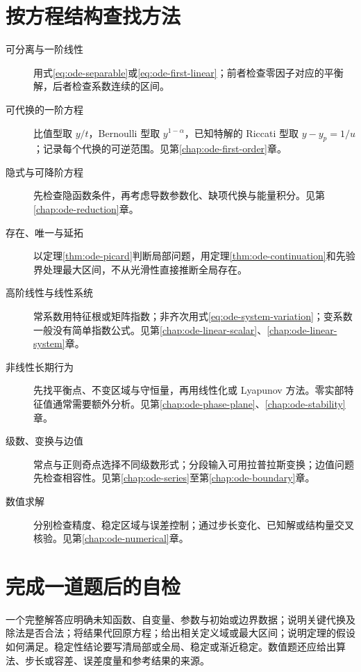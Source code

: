 \documentclass[UTF8,12pt,a4paper,fontset=fandol]{ctexbook}
\begin{document}
\section{按方程结构查找方法}
\begin{description}
 \item[可分离与一阶线性] 用式\eqref{eq:ode-separable}或\eqref{eq:ode-first-linear}；前者检查零因子对应的平衡解，后者检查系数连续的区间。
 \item[可代换的一阶方程] 比值型取 $y/t$，Bernoulli 型取 $y^{1-\alpha}$，已知特解的 Riccati 型取 $y-y_p=1/u$；记录每个代换的可逆范围。见第\ref{chap:ode-first-order}章。
 \item[隐式与可降阶方程] 先检查隐函数条件，再考虑导数参数化、缺项代换与能量积分。见第\ref{chap:ode-reduction}章。
 \item[存在、唯一与延拓] 以定理\ref{thm:ode-picard}判断局部问题，用定理\ref{thm:ode-continuation}和先验界处理最大区间，不从光滑性直接推断全局存在。
 \item[高阶线性与线性系统] 常系数用特征根或矩阵指数；非齐次用式\eqref{eq:ode-system-variation}；变系数一般没有简单指数公式。见第\ref{chap:ode-linear-scalar}、\ref{chap:ode-linear-system}章。
 \item[非线性长期行为] 先找平衡点、不变区域与守恒量，再用线性化或 Lyapunov 方法。零实部特征值通常需要额外分析。见第\ref{chap:ode-phase-plane}、\ref{chap:ode-stability}章。
 \item[级数、变换与边值] 常点与正则奇点选择不同级数形式；分段输入可用拉普拉斯变换；边值问题先检查相容性。见第\ref{chap:ode-series}至第\ref{chap:ode-boundary}章。
 \item[数值求解] 分别检查精度、稳定区域与误差控制；通过步长变化、已知解或结构量交叉核验。见第\ref{chap:ode-numerical}章。
\end{description}

\section{完成一道题后的自检}
一个完整解答应明确未知函数、自变量、参数与初始或边界数据；说明关键代换及除法是否合法；将结果代回原方程；给出相关定义域或最大区间；说明定理的假设如何满足。稳定性结论要写清局部或全局、稳定或渐近稳定。数值题还应给出算法、步长或容差、误差度量和参考结果的来源。
\end{document}
